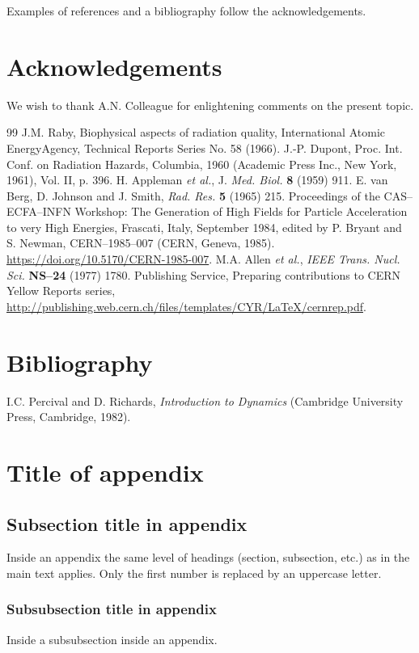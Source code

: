 \documentclass{article}
\begin{document}
Examples of references and a bibliography follow the acknowledgements.

\section*{Acknowledgements}

We wish to thank A.N. Colleague for enlightening comments on
the present topic.

\begin{thebibliography}{99}
J.M. Raby, Biophysical aspects of radiation quality, International 
Atomic EnergyAgency, Technical Reports Series No. 58 (1966).
J.-P. Dupont, Proc. Int. Conf. on Radiation Hazards, Columbia, 
1960 (Academic Press Inc., New York, 1961), Vol. II, p. 396.
H. Appleman \emph{et al.}, J. \emph{Med. Biol.} \textbf{8} (1959) 911.
E. van Berg, D. Johnson and J. Smith, \emph{Rad. Res.} \textbf{5} (1965) 
215.
Proceedings of the CAS--ECFA--INFN Workshop: The Generation of High Fields for Particle Acceleration to very High Energies, Frascati, Italy, September 1984, edited by P. Bryant and S. Newman, CERN--1985--007 (CERN, Geneva, 1985).\\
\url{https://doi.org/10.5170/CERN-1985-007}.
M.A. Allen \emph{et al.}, \emph{IEEE Trans. Nucl. Sci.} \textbf{NS--24} (1977) 
1780.
Publishing Service, Preparing contributions to CERN Yellow Reports series,\\
\url{http://publishing.web.cern.ch/files/templates/CYR/LaTeX/cernrep.pdf}.
\end{thebibliography}

\section*{Bibliography}


I.C. Percival and D. Richards, \emph{Introduction to Dynamics}
(Cambridge University Press, Cambridge, 1982).


\section{Title of appendix}
\label{sec:app}

\subsection{Subsection title in appendix}

Inside an appendix the same level of headings (section, subsection,
etc.) as in the main text applies. Only the first number is replaced
by an uppercase letter.

\subsubsection{Subsubsection title in appendix}

Inside a subsubsection inside an appendix.

\end{document}
